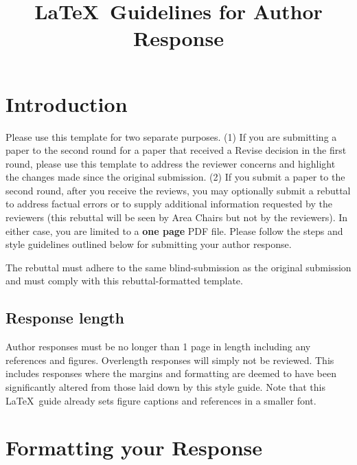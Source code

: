 \documentclass[10pt,twocolumn,letterpaper]{article}
\begin{document}
\title{\LaTeX\ Guidelines for Author Response}  %

\maketitle


\section{Introduction}

Please use this template for two separate purposes. (1) If you are
submitting a paper to the second round for a paper that received a
Revise decision in the first round, please use this template to
address the reviewer concerns and highlight the changes made since the
original submission. (2) If you submit a paper to the second round,
after you receive the reviews, you may optionally submit a rebuttal to
address factual errors or to supply additional information requested by
the reviewers (this rebuttal will be seen by Area Chairs but not by
the reviewers).  In either case, you are limited to a {\bf one page}
PDF file.  Please follow the steps and style guidelines outlined below
for submitting your author response.


The rebuttal must adhere to the same blind-submission as the original submission and must comply with this rebuttal-formatted template.


\subsection{Response length}
Author responses must be no longer than 1 page in length including any references and figures.  Overlength responses will simply not be reviewed.  This includes responses where the margins and formatting are deemed to have been significantly altered from those laid down by this style guide.  Note that this \LaTeX\ guide already sets figure captions and references in a smaller font.

\section{Formatting your Response}
\end{document}
